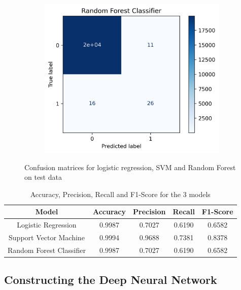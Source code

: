 \documentclass[utf8x]{ctexart}
\begin{document}
\begin{figure}[htb]
\begin{subfigure}[b]{0.32\textwidth}
  \end{subfigure}
  \begin{subfigure}[b]{0.32\textwidth}
    \centering
    \includegraphics[width=\textwidth]{./images/rfc_conf1.png}
    \label{fig:scalelocationplotprice}
  \end{subfigure}
  \caption{Confusion matrices for logistic regression, SVM and Random Forest on test data}
  \label{fig:confusion1}
\end{figure}

\begin{table}[ht]
  \centering
  \caption{Accuracy, Precision, Recall and F1-Score for the 3 models}
  \label{tab:metrics1}
  \begin{tabular}{c|cccc}
    Model                    & Accuracy & Precision & Recall & F1-Score \\
    \hline
    Logistic Regression      & 0.9987   & 0.7027    & 0.6190 & 0.6582   \\
    Support Vector Machine   & 0.9994   & 0.9688    & 0.7381 & 0.8378   \\
    Random Forest Classifier & 0.9987   & 0.7027    & 0.6190 & 0.6582   \\
  \end{tabular}
\end{table}


\subsection{Constructing the Deep Neural Network}
\end{document}
